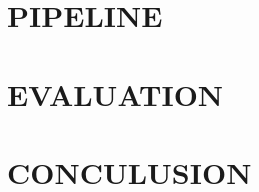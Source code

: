 \documentclass[english]{ccdconf}
\begin{document}
\section{PIPELINE}
\section{EVALUATION}
\section{CONCULUSION}
%
\end{document}
